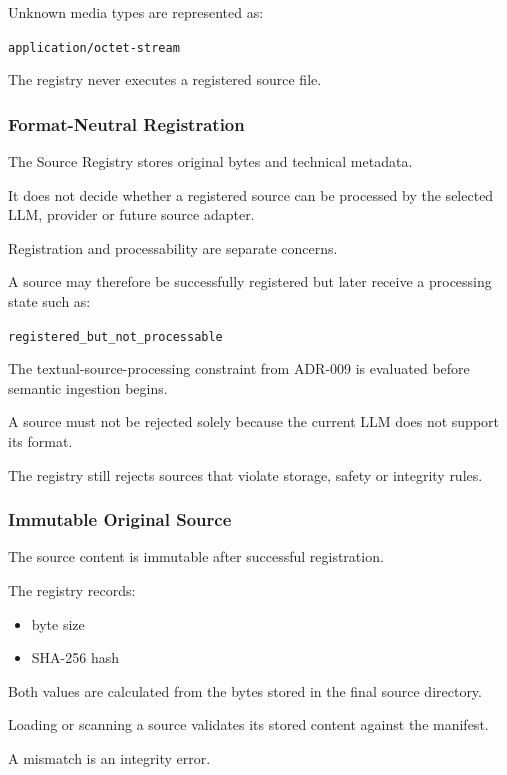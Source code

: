 Unknown media types are represented as:

\texttt{application/octet-stream}

The registry never executes a registered source file.

\hypertarget{format-neutral-registration}{%
\subsubsection{Format-Neutral Registration}\label{format-neutral-registration}}

The Source Registry stores original bytes and technical metadata.

It does not decide whether a registered source can be processed by the selected LLM, provider or future source adapter.

Registration and processability are separate concerns.

A source may therefore be successfully registered but later receive a processing state such as:

\texttt{registered\_but\_not\_processable}

The textual-source-processing constraint from ADR-009 is evaluated before semantic ingestion begins.

A source must not be rejected solely because the current LLM does not support its format.

The registry still rejects sources that violate storage, safety or integrity rules.

\hypertarget{immutable-original-source-1}{%
\subsubsection{Immutable Original Source}\label{immutable-original-source-1}}

The source content is immutable after successful registration.

The registry records:

\begin{itemize}
\tightlist
\item
  byte size
\item
  SHA-256 hash
\end{itemize}

Both values are calculated from the bytes stored in the final source directory.

Loading or scanning a source validates its stored content against the manifest.

A mismatch is an integrity error.

